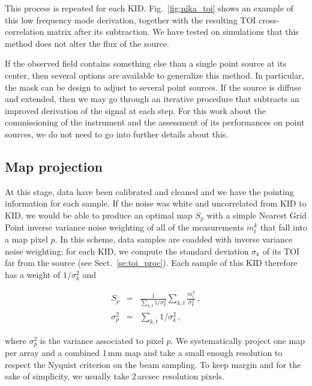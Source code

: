 This process is repeated for each KID. Fig.~\ref{fig:nika_toi} shows an example
of this low frequency mode derivation, together with the resulting TOI
cross-correlation matrix after its subtraction. We have tested on simulations
that this method does not alter the flux of the source.

If the observed field contains something else than a single point source at its
center, then several options are available to generalize this method. In
particular, the mask can be design to adjust to several point sources. If the
source is diffuse and extended, then we may go through an iterative procedure that
subtracts an improved derivation of the signal at each step. For this work about
the commissioning of the instrument and the assessment of its performances on
point sources, we do not need to go into further details about this.

\subsection{Map projection}
\label{se:map_projection}

At this stage, data have been calibrated and cleaned and we have the pointing
information for each sample. If the noise was white and uncorrelated from KID to
KID, we would be able to produce an optimal map $S_p$ with a simple Nearest Grid
Point inverse variance noise weighting of all of the measurements $m^k_t$ that
fall into a map pixel $p$. In this scheme, data samples are coadded with inverse
variance noise weighting: for each KID, we compute the standard deviation
$\sigma_k$ of its TOI far from the source (see Sect.~\ref{se:toi_proc}). Each
sample of this KID therefore has a weight of $1/\sigma_k^2$ and

\begin{eqnarray}
S_p        &=& \frac{1}{\sum_{k,t}1/\sigma_k^2}\sum_{k,t} \frac{m^k_t}{\sigma_k^2}\,, \label{eq:ngp_sum}\\
\sigma^2_p &=& \sum_{k,t}1/\sigma_k^2\,, \label{eq:ngp_var}
\end{eqnarray}

where $\sigma^2_p$ is the variance associated to pixel $p$. We systematically
project one map per array and a combined 1\,mm map and take a small enough
resolution to respect the Nyquist criterion on the beam sampling. To keep margin
and for the sake of simplicity, we usually take 2\,arcsec resolution pixels.

